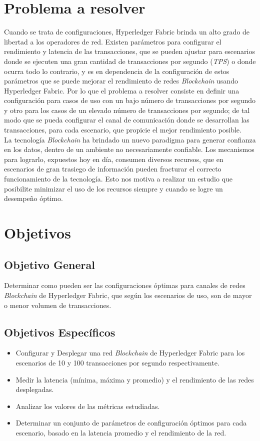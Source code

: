 \section{Problema a resolver}
Cuando se trata de configuraciones, Hyperledger Fabric brinda un alto grado de libertad a los operadores de red. Existen par\'ametros para configurar el rendimiento y latencia de las transacciones, que se pueden ajustar para escenarios donde se ejecuten una gran cantidad de transacciones por segundo (\emph{TPS}) o donde ocurra todo lo contrario, y es en dependencia de la configuraci\'on de estos par\'ametros que se puede mejorar el rendimiento de redes \emph{Blockchain} usando Hyperledger Fabric. Por lo que el problema a resolver consiste en definir una configuraci\'on para casos de uso con un bajo n\'umero de transacciones por segundo y otro para los casos de un elevado n\'umero de transacciones por segundo; de tal modo que se pueda configurar el canal de comunicaci\'on donde se desarrollan las transacciones, para cada escenario, que propicie el mejor rendimiento posible.\\

La tecnolog\'ia \emph{Blockchain} ha brindado un nuevo paradigma para generar confianza en los datos, dentro de un ambiente no necesariamente confiable. Los mecanismos para lograrlo, expuestos hoy en d\'ia, consumen diversos recursos, que en escenarios de gran trasiego de informaci\'on pueden fracturar el correcto funcionamiento de la tecnolog\'ia. Esto nos motiva a realizar un estudio que posibilite minimizar el uso de los recursos siempre y cuando se logre un desempe\~no \'optimo.


\section{Objetivos}
\subsection{Objetivo General}
Determinar como pueden ser las configuraciones \'optimas para canales de redes \emph{Blockchain} de Hyperledger Fabric, que seg\'un los escenarios de uso, son de mayor o menor volumen de transacciones.

{\vspace{0.5 cm}}

\subsection{Objetivos Espec\'ificos}
\begin{itemize}
\item Configurar y Desplegar una red \emph{Blockchain} de Hyperledger Fabric para los escenarios de 10 y 100 transacciones por segundo respectivamente.
\item Medir la latencia (m\'inima, m\'axima y promedio) y el rendimiento de las redes desplegadas.
\item Analizar los valores de las m\'etricas estudiadas.
\item Determinar un conjunto de par\'ametros de configuraci\'on \'optimos para cada escenario, basado en la latencia promedio y el rendimiento de la red.
\end{itemize}

